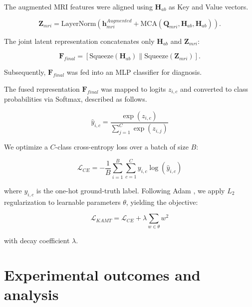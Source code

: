 \documentclass[lettersize,journal]{IEEEtran}
\begin{document}
    The augmented MRI features were aligned using $\mathbf{H}_{ab}$ as Key and Value vectors.
    
    \begin{equation}
        \mathbf{Z}_{mri} = \mathrm{LayerNorm}(\mathbf{h}_{mri}^{Augmented} + \mathrm{MCA}(\mathbf{Q}_{mri}, \mathbf{H}_{ab}, \mathbf{H}_{ab})).
        \label{eq:mri_alignment}
    \end{equation}

    The joint latent representation concatenates only $\mathbf{H}_{ab}$ and $\mathbf{Z}_{mri}$:

    \begin{equation}
    \mathbf{F}_{final} = [ \mathrm{Squeeze}(\mathbf{H}_{ab}) \parallel \mathrm{Squeeze}(\mathbf{Z}_{mri}) ].
    \label{eq:final_fusion}
    \end{equation}

    Subsequently, $\mathbf{F}_{final}$ was fed into an MLP classifier for diagnosis.


    The fused representation $\mathbf{F}_{final}$ was mapped to logits $z_{i,c}$ and converted to class probabilities via Softmax, described as follows.
    
    \begin{equation}
        \hat{y}_{i,c} = \frac{\exp(z_{i,c})}{\sum_{j=1}^{C} \exp(z_{i,j})}
        \label{eq:softmax}
    \end{equation}

    We optimize a $C$-class cross-entropy loss over a batch of size $B$:
    
    \begin{equation}
        \mathcal{L}_{CE} = - \frac{1}{B} \sum_{i=1}^{B} \sum_{c=1}^{C} y_{i,c} \log(\hat{y}_{i,c})
        \label{eq:cross_entropy}
    \end{equation}

    where $y_{i,c}$ is the one-hot ground-truth label. Following Adam \cite{kingma2014adam}, we apply $L_2$ regularization to learnable parameters $\theta$, yielding the objective:
    
    \begin{equation}
        \mathcal{L}_{KAMT} = \mathcal{L}_{CE} + \lambda \sum_{w \in \theta} w^2
        \label{eq:total_loss}
    \end{equation}

    with decay coefficient $\lambda$.

\section{Experimental outcomes and analysis}
\end{document}
